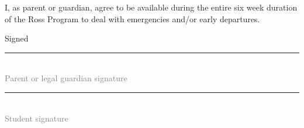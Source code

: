 \documentclass{ross}
\begin{document}
\pagebreak

I, as parent or guardian, agree to be available during the entire six
week duration of the Ross Program to deal with emergencies and/or early
departures.

\vspace{0.5in}
\hfill Signed \rule{3in}{0.1mm}\\[-1.5mm]
\hspace*{3.7in} {\footnotesize \textcolor{gray}{Parent or legal guardian signature} }


\vspace{0.5in}

\hfill  \rule{3in}{0.1mm}\\[-1.5mm]
\hspace*{3.7in} {\footnotesize \textcolor{gray}{Student signature} }


\end{document}

